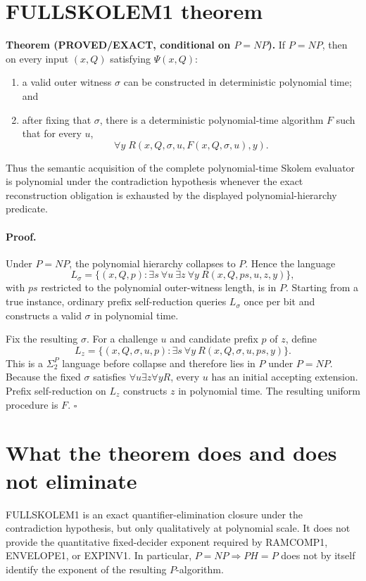 \documentclass[11pt]{article}
\begin{document}
\section*{FULLSKOLEM1 theorem}
\textbf{Theorem (PROVED/EXACT, conditional on \(P=NP\)).}
If \(P=NP\), then on every input \((x,Q)\) satisfying \(\Psi(x,Q)\):
\begin{enumerate}
\item a valid outer witness \(\sigma\) can be constructed in deterministic polynomial time; and
\item after fixing that \(\sigma\), there is a deterministic polynomial-time algorithm \(F\) such that for every \(u\),
\[
\forall y\;R(x,Q,\sigma,u,F(x,Q,\sigma,u),y).
\]
\end{enumerate}
Thus the semantic acquisition of the complete polynomial-time Skolem evaluator is polynomial under the contradiction hypothesis whenever the exact reconstruction obligation is exhausted by the displayed polynomial-hierarchy predicate.

\paragraph{Proof.}
Under \(P=NP\), the polynomial hierarchy collapses to \(P\). Hence the language
\[
L_\sigma=\{(x,Q,p):\exists s\ \forall u\ \exists z\ \forall y\
R(x,Q,ps,u,z,y)\},
\]
with \(ps\) restricted to the polynomial outer-witness length, is in \(P\). Starting from a true instance, ordinary prefix self-reduction queries \(L_\sigma\) once per bit and constructs a valid \(\sigma\) in polynomial time.

Fix the resulting \(\sigma\). For a challenge \(u\) and candidate prefix \(p\) of \(z\), define
\[
L_z=\{(x,Q,\sigma,u,p):\exists s\ \forall y\
R(x,Q,\sigma,u,ps,y)\}.
\]
This is a \(\Sigma_2^P\) language before collapse and therefore lies in \(P\) under \(P=NP\). Because the fixed \(\sigma\) satisfies \(\forall u\exists z\forall y R\), every \(u\) has an initial accepting extension. Prefix self-reduction on \(L_z\) constructs \(z\) in polynomial time. The resulting uniform procedure is \(F\). \(\square\)

\section*{What the theorem does and does not eliminate}
FULLSKOLEM1 is an exact quantifier-elimination closure under the contradiction hypothesis, but only qualitatively at polynomial scale. It does not provide the quantitative fixed-decider exponent required by RAMCOMP1, ENVELOPE1, or EXPINV1. In particular, \(P=NP\Rightarrow PH=P\) does not by itself identify the exponent of the resulting \(P\)-algorithm.
\end{document}
